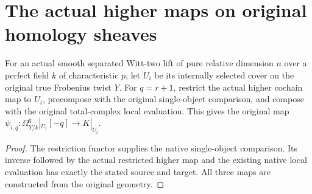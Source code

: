 \section{The actual higher maps on original homology sheaves}
\label{sec:di-actual-witt-higher-cartier}

\begin{definition}
\label{def:di-actual-witt-higher-member-cochain}
\leanok
{}
For an actual smooth separated Witt-two lift of pure relative dimension
$n$ over a perfect field $k$ of characteristic $p$, let $U_i$ be its
internally selected cover on the original true Frobenius twist $Y$.
For $q=r+1$, restrict the actual higher cochain map to $U_i$, precompose
with the original single-object comparison, and compose with the
original total-complex local evaluation. This gives the original map
$\psi_{i,q}:\Omega^q_{Y/k}|_{U_i}[-q]\to K|_{U_i}$.
\end{definition}
\begin{proof}
\leanok
The restriction functor supplies the native single-object comparison.
Its inverse followed by the actual restricted higher map and the
existing native local evaluation has exactly the stated source and
target. All three maps are constructed from the original geometry.
\end{proof}

